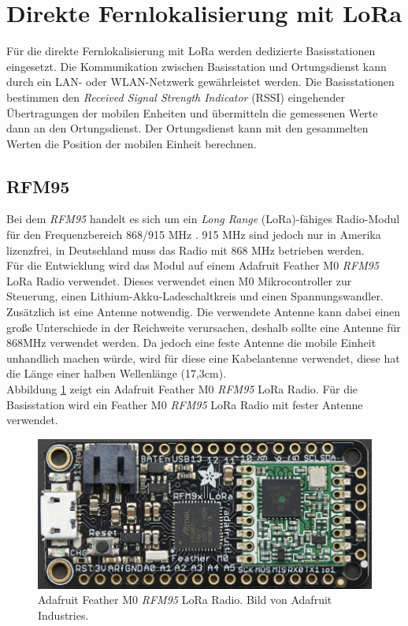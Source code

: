 \section{Direkte Fernlokalisierung mit LoRa}
\label{ch:phase4}
Für die direkte Fernlokalisierung mit LoRa werden dedizierte Basisstationen eingesetzt. 
Die Kommunikation zwischen Basisstation und Ortungsdienst kann durch ein LAN- oder WLAN-Netzwerk gewährleistet werden.
Die Basisstationen bestimmen den \emph{Received Signal Strength Indicator} (RSSI) eingehender Übertragungen der mobilen Enheiten und übermitteln die gemessenen Werte dann an den Ortungsdienst.
Der Ortungsdienst kann mit den gesammelten Werten die Position der mobilen Einheit berechnen.

\subsection{RFM95}
\label{ch:hardwarechanges:sec:rfm95}
Bei dem \emph{RFM95} handelt es sich um ein \emph{Long Range} (LoRa)-fähiges Radio-Modul für den Frequenzbereich 868/915 MHz \cite{hope2006rfm}. 
915 MHz sind jedoch nur in Amerika lizenzfrei, in Deutschland muss das Radio mit 868 MHz betrieben werden.\\
Für die Entwicklung wird das Modul auf einem Adafruit Feather M0 \emph{RFM95} LoRa Radio verwendet.
Dieses verwendet einen M0 Mikrocontroller zur Steuerung, einen Lithium-Akku-Ladeschaltkreis und einen Spannungswandler.
Zusätzlich ist eine Antenne notwendig. 
Die verwendete Antenne kann dabei einen große Unterschiede in der Reichweite verursachen, deshalb sollte eine Antenne für 868MHz verwendet werden.
Da jedoch eine feste Antenne die mobile Einheit unhandlich machen würde, wird für diese eine Kabelantenne verwendet, diese hat die Länge einer halben Wellenlänge (17,3cm).\\
Abbildung \ref{fig:lorafeather} zeigt ein Adafruit Feather M0 \emph{RFM95} LoRa Radio. 
Für die Basisstation wird ein Feather M0 \emph{RFM95} LoRa Radio mit fester Antenne verwendet.

\begin{figure}[h]
  \centering
	\includegraphics[width=\textwidth]{images/loraada.png}
  \caption{Adafruit Feather M0 \emph{RFM95} LoRa Radio. Bild von Adafruit Industries\protect \footnotemark.}
  \label{fig:lorafeather}
\end{figure}

